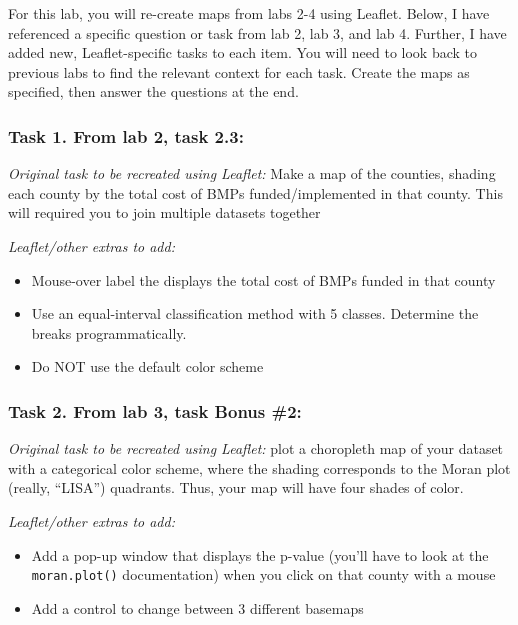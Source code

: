 \documentclass[]{article}
\begin{document}
For this lab, you will re-create maps from labs 2-4 using Leaflet.
Below, I have referenced a specific question or task from lab 2, lab 3,
and lab 4. Further, I have added new, Leaflet-specific tasks to each
item. You will need to look back to previous labs to find the relevant
context for each task. Create the maps as specified, then answer the
questions at the end.

\subsubsection{Task 1. From lab 2, task
2.3:}\label{task-1.-from-lab-2-task-2.3}

\emph{Original task to be recreated using Leaflet:} Make a map of the
counties, shading each county by the total cost of BMPs
funded/implemented in that county. This will required you to join
multiple datasets together

\emph{Leaflet/other extras to add:}

\begin{itemize}
\item
  Mouse-over label the displays the total cost of BMPs funded in that
  county
\item
  Use an equal-interval classification method with 5 classes. Determine
  the breaks programmatically.
\item
  Do NOT use the default color scheme
\end{itemize}

\subsubsection{Task 2. From lab 3, task Bonus
\#2:}\label{task-2.-from-lab-3-task-bonus-2}

\emph{Original task to be recreated using Leaflet:} plot a choropleth
map of your dataset with a categorical color scheme, where the shading
corresponds to the Moran plot (really, ``LISA'') quadrants. Thus, your
map will have four shades of color.

\emph{Leaflet/other extras to add:}

\begin{itemize}
\item
  Add a pop-up window that displays the p-value (you'll have to look at
  the \texttt{moran.plot()} documentation) when you click on that county
  with a mouse
\item
  Add a control to change between 3 different basemaps
\end{itemize}
\end{document}
